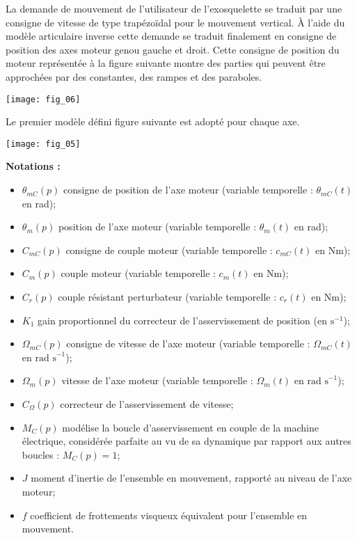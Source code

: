 \begin{multicols}{2}
\ifprof
\else
La demande de mouvement de l’utilisateur de l’exosquelette se traduit par une consigne de vitesse de type
trapézoïdal pour le mouvement vertical. À l’aide du modèle articulaire inverse cette
demande se traduit finalement en consigne de position des axes moteur genou gauche et droit. Cette consigne de position du moteur représentée à la figure suivante montre des parties qui peuvent être approchées par des constantes,
des rampes et des paraboles.

\begin{center}
\texttt{[image: fig\_06]}
\end{center}

Le premier modèle défini figure suivante est adopté pour chaque axe.


\begin{center}
\texttt{[image: fig\_05]}
\end{center}

\textbf{Notations : }
\begin{itemize}
\item $\theta_{mC}(p)$ consigne de position de l’axe moteur (variable temporelle : $\theta_{mC}(t)$ en rad);
\item $\theta_{m}(p)$ position de l’axe moteur (variable temporelle : $\theta_{m}(t)$ en rad);
\item $C_{mC}(p)$ consigne de couple moteur (variable temporelle : $c_{mC}(t)$ en Nm);
\item $C_{m}(p)$ couple moteur (variable temporelle : $c_{m}(t)$ en Nm);
\item $C_{r}(p)$ couple résistant perturbateur (variable temporelle : $c_{r}(t)$ en Nm);
\item $K_1$ gain proportionnel du correcteur de l’asservissement de position (en $\text{s}^{-1}$);
\item $\Omega_{mC}(p)$ consigne de vitesse de l’axe moteur (variable temporelle : $\Omega_{mC}(t)$ en $\text{rad s}^{-1}$);
\item $\Omega_{m}(p)$ vitesse de l’axe moteur (variable temporelle : $\Omega_{m}(t)$ en  $\text{rad s}^{-1}$);
\item $C_{\Omega}(p)$ correcteur de l’asservissement de vitesse;
\item $M_C(p)$ modélise la boucle d’asservissement en couple de la machine électrique, considérée parfaite au vu de sa dynamique par rapport aux autres boucles : $M_C(p)=1$; 
\item $J$ moment d’inertie de l’ensemble en mouvement, rapporté au niveau de l’axe moteur;
\item $f$ coefficient de frottements visqueux équivalent pour l’ensemble en mouvement.
\end{itemize}



\end{multicols}
